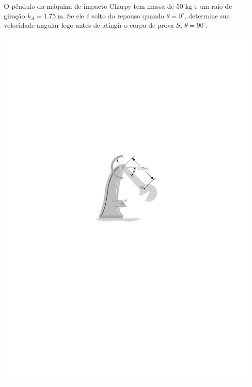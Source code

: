 \item O pêndulo da máquina de impacto Charpy tem massa de 50 kg e um raio de giração $k_{A}=\SI{1.75}{\meter}$. Se ele é
solto do repouso quando $\theta=0^{\circ}$, determine sua velocidade angular logo antes de atingir o corpo de prova
$S$, $\theta=90^{\circ}$.

\begin{flushright}
	\includegraphics[scale=1.3]{../../images/draw_2}
\end{flushright}